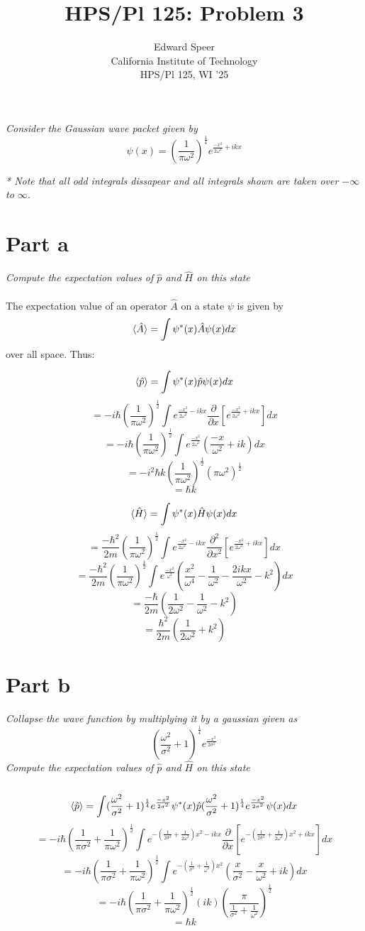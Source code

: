 \documentclass[11pt, a4paper]{article}
\title{HPS/Pl 125: Problem 3}
\author{%
  Edward Speer
  \\
  California Institute of Technology\\
  HPS/Pl 125, WI '25 \\
}
\date{\monthyeardate}
\begin{document}
\maketitle

\noindent \emph{Consider the Gaussian wave packet given by
\[\psi(x)=(\frac{1}{\pi\omega^2})^{\frac{1}{4}}e^{\frac{-x^2}{2\omega^2}+ikx}\]}

\emph{* Note that all odd integrals dissapear and all integrals shown are taken
over $-\infty$ to $\infty$.}

\section{Part a} \emph{Compute the expectation values of $\hat{p}$ and
$\hat{H}$ on this state}
\\ \hfill \\
The expectation value of an operator $\hat{A}$ on a state $\psi$ is given by
\[\braket{\hat{A}} = \int \psi^*(x)\hat{A}\psi(x)dx\] over all space. Thus:

\[\braket{\hat{p}} = \int \psi^*(x)\hat{p}\psi(x)dx\]
\[= -i\hbar(\frac{1}{\pi\omega^2})^{\frac{1}{2}}\int e^{\frac{-x^2}{2\omega^2}-ikx} \frac{\partial}{\partial x}[e^{\frac{-x^2}{2\omega^2}+ikx}]dx\]
\[=-i\hbar(\frac{1}{\pi\omega^2})^{\frac{1}{2}}\int e^{\frac{-x^2}{2\omega^2}}(\frac{-x}{\omega^2}+ik)dx\]
\[= -i^2\hbar k(\frac{1}{\pi\omega^2})^{\frac{1}{2}}(\pi\omega^2)^{\frac{1}{2}}\]
\[\boxed{=\hbar k}\]

\[\braket{\hat{H}} = \int \psi^*(x)\hat{H}\psi(x)dx\]
\[= \frac{-\hbar^2}{2m}(\frac{1}{\pi\omega^2})^\frac{1}{2}\int e^{\frac{-x^2}{2\omega^2}-ikx}\frac{\partial^2}{\partial x^2}[e^{\frac{-x^2}{2\omega^2}+ikx}]dx\]
\[=\frac{-\hbar^2}{2m}(\frac{1}{\pi\omega^2})^\frac{1}{2}\int e^{\frac{-x^2}{\omega^2}}(\frac{x^2}{\omega^4}-\frac{1}{\omega^2}-\frac{2ikx}{\omega^2}-k^2)dx\]
\[= \frac{-\hbar}{2m}(\frac{1}{2\omega^2}-\frac{1}{\omega^2}-k^2)\]
\[\boxed{=\frac{\hbar^2}{2m}(\frac{1}{2\omega^2}+k^2)}\]

\section{Part b} \emph{Collapse the wave function by multiplying it by a
gaussian given as \[(\frac{\omega^2}{\sigma^2}+1)^{\frac{1}{4}}e^{\frac{-x^2}{2\sigma^2}}\]
Compute the expectation values of $\hat{p}$ and $\hat{H}$ on this state}
\\ \hfill \\
\[\braket{\hat{p}} = \int (\frac{\omega^2}{\sigma^2}+1)^{\frac{1}{4}}e^{\frac{-x^2}{2\sigma^2}}\psi^*(x)\hat{p}(\frac{\omega^2}{\sigma^2}+1)^{\frac{1}{4}}e^{\frac{-x^2}{2\sigma^2}}\psi(x)dx\]
\[=-i\hbar(\frac{1}{\pi\sigma^2}+\frac{1}{\pi\omega^2})^\frac{1}{2}\int e^{-(\frac{1}{2\sigma^2}+\frac{1}{2\omega^2})x^2-ikx}\frac{\partial}{\partial x}[e^{-(\frac{1}{2\sigma^2}+\frac{1}{2\omega^2})x^2+ikx}]dx\]
\[=-i\hbar(\frac{1}{\pi\sigma^2}+\frac{1}{\pi\omega^2})^\frac{1}{2}\int e^{-(\frac{1}{\sigma^2}+\frac{1}{\omega^2})x^2}(\frac{x}{\sigma^2}-\frac{x}{\omega^2}+ik)dx\]
\[=-i\hbar(\frac{1}{\pi\sigma^2}+\frac{1}{\pi\omega^2})^\frac{1}{2}(ik)(\frac{\pi}{\frac{1}{\sigma^2}+\frac{1}{\omega^2}})^{\frac{1}{2}}\]
\[=\boxed{\hbar k}\]
\end{document}
